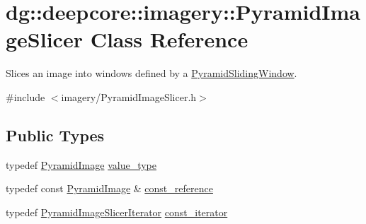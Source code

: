 \hypertarget{classdg_1_1deepcore_1_1imagery_1_1_pyramid_image_slicer}{}\section{dg\+:\+:deepcore\+:\+:imagery\+:\+:Pyramid\+Image\+Slicer Class Reference}
\label{classdg_1_1deepcore_1_1imagery_1_1_pyramid_image_slicer}


Slices an image into windows defined by a \hyperlink{classdg_1_1deepcore_1_1imagery_1_1_pyramid_sliding_window}{Pyramid\+Sliding\+Window}.  




{\ttfamily \#include $<$imagery/\+Pyramid\+Image\+Slicer.\+h$>$}

\subsection*{Public Types}
\begin{DoxyCompactItemize}
\item 
typedef \hyperlink{structdg_1_1deepcore_1_1imagery_1_1_pyramid_image}{Pyramid\+Image} \hyperlink{classdg_1_1deepcore_1_1imagery_1_1_pyramid_image_slicer_a6a2ca5ffdf4ce25771ce96dec3be678a}{value\+\_\+type}
\item 
typedef const \hyperlink{structdg_1_1deepcore_1_1imagery_1_1_pyramid_image}{Pyramid\+Image} \& \hyperlink{classdg_1_1deepcore_1_1imagery_1_1_pyramid_image_slicer_ae420ea4b1c5ecc7801eb1a827cfa6252}{const\+\_\+reference}
\item 
typedef \hyperlink{classdg_1_1deepcore_1_1imagery_1_1_pyramid_image_slicer_iterator}{Pyramid\+Image\+Slicer\+Iterator} \hyperlink{classdg_1_1deepcore_1_1imagery_1_1_pyramid_image_slicer_ae7aff5a41f1137d54f566127aa2bb957}{const\+\_\+iterator}
\end{DoxyCompactItemize}
